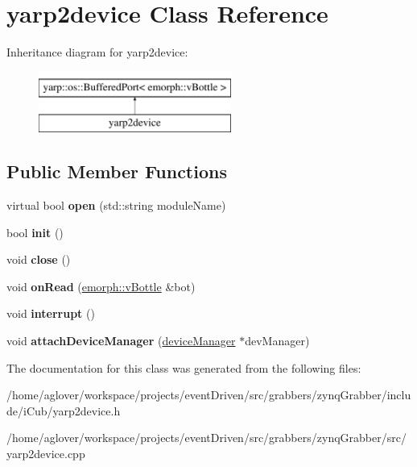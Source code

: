 \hypertarget{classyarp2device}{\section{yarp2device Class Reference}
\label{classyarp2device}
}
Inheritance diagram for yarp2device\-:\begin{figure}[H]
\begin{center}
\leavevmode
\includegraphics[height=2.000000cm]{classyarp2device}
\end{center}
\end{figure}
\subsection*{Public Member Functions}
\begin{DoxyCompactItemize}
\item 
\hypertarget{classyarp2device_a664050547336bee12457bb4c346727a6}{virtual bool {\bfseries open} (std\-::string module\-Name)}\label{classyarp2device_a664050547336bee12457bb4c346727a6}

\item 
\hypertarget{classyarp2device_a56b9560746d5dec6168f62426b302598}{bool {\bfseries init} ()}\label{classyarp2device_a56b9560746d5dec6168f62426b302598}

\item 
\hypertarget{classyarp2device_a4031dba4c05576ca4f444fe496fd1f42}{void {\bfseries close} ()}\label{classyarp2device_a4031dba4c05576ca4f444fe496fd1f42}

\item 
\hypertarget{classyarp2device_a0c5a6e14866a7cb8002bfa87fd293059}{void {\bfseries on\-Read} (\hyperlink{classemorph_1_1vBottle}{emorph\-::v\-Bottle} \&bot)}\label{classyarp2device_a0c5a6e14866a7cb8002bfa87fd293059}

\item 
\hypertarget{classyarp2device_ad2c4ae1fdb9839805c806d0084fdd20a}{void {\bfseries interrupt} ()}\label{classyarp2device_ad2c4ae1fdb9839805c806d0084fdd20a}

\item 
\hypertarget{classyarp2device_ab7e89f9acbec43013529e014162ce902}{void {\bfseries attach\-Device\-Manager} (\hyperlink{classdeviceManager}{device\-Manager} $\ast$dev\-Manager)}\label{classyarp2device_ab7e89f9acbec43013529e014162ce902}

\end{DoxyCompactItemize}


The documentation for this class was generated from the following files\-:\begin{DoxyCompactItemize}
\item 
/home/aglover/workspace/projects/event\-Driven/src/grabbers/zynq\-Grabber/include/i\-Cub/yarp2device.\-h\item 
/home/aglover/workspace/projects/event\-Driven/src/grabbers/zynq\-Grabber/src/yarp2device.\-cpp\end{DoxyCompactItemize}
